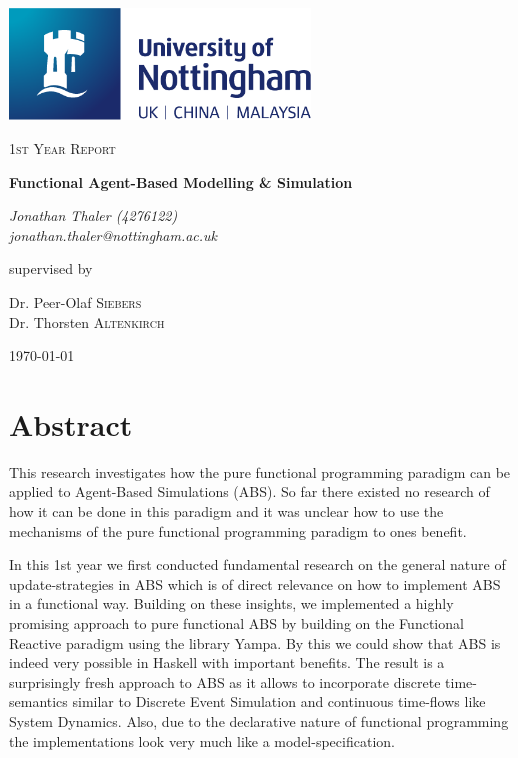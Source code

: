 \documentclass[oneside]{book}
\begin{document}
\begin{titlepage}
	\centering
	\includegraphics[width=0.60\textwidth]{./logo/UoN_Primary_Logo_RGB.png}\par\vspace{1cm}
	{\scshape\Large 1st Year Report\par}
	\vspace{1.5cm}
	{\huge\bfseries Functional Agent-Based Modelling \& Simulation\par}
	\vspace{2cm}
	{\Large\itshape Jonathan Thaler (4276122) \\ jonathan.thaler@nottingham.ac.uk \par}
	\vfill
	supervised by\par
	Dr. Peer-Olaf \textsc{Siebers} \\
	Dr. Thorsten \textsc{Altenkirch}

	\vfill

	{\large \today\par}
\end{titlepage}

\cleardoublepage

\section*{Abstract}
This research investigates how the pure functional programming paradigm can be applied to Agent-Based Simulations (ABS). So far there existed no research of how it can be done in this paradigm and it was unclear how to use the mechanisms of the pure functional programming paradigm to ones benefit.

In this 1st year we first conducted fundamental research on the general nature of update-strategies in ABS which is of direct relevance on how to implement ABS in a functional way.
Building on these insights, we implemented a highly promising approach to pure functional ABS by building on the Functional Reactive paradigm using the library Yampa. By this we could show that ABS is indeed very possible in Haskell with important benefits. The result is a surprisingly fresh approach to ABS as it allows to incorporate discrete time-semantics similar to Discrete Event Simulation and continuous time-flows like System Dynamics. Also, due to the declarative nature of functional programming the implementations look very much like a model-specification.
\end{document}
